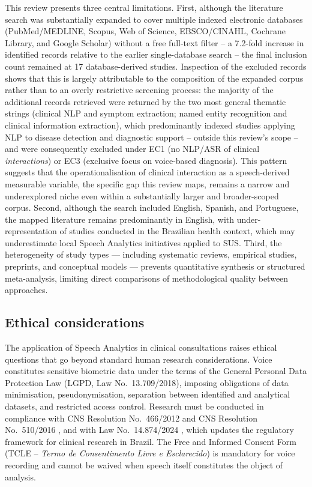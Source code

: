 \documentclass[review,12pt]{elsarticle}
\begin{document}
This review presents three central limitations.
First, although the literature search was substantially expanded to cover
multiple indexed electronic databases (PubMed/MEDLINE, Scopus, Web of
Science, EBSCO/CINAHL, Cochrane Library, and Google Scholar) without a
free full-text filter -- a 7.2-fold increase in identified records relative
to the earlier single-database search -- the final inclusion count remained
at 17 database-derived studies. Inspection of the excluded records shows
that this is largely attributable to the composition of the expanded
corpus rather than to an overly restrictive screening process: the
majority of the additional records retrieved were returned by the two most
general thematic strings (clinical NLP and symptom extraction; named
entity recognition and clinical information extraction), which
predominantly indexed studies applying NLP to disease detection and
diagnostic support -- outside this review's scope -- and were
consequently excluded under EC1 (no NLP/ASR of clinical
\emph{interactions}) or EC3 (exclusive focus on voice-based diagnosis).
This pattern suggests that the operationalisation of clinical interaction
as a speech-derived measurable variable, the specific gap this review
maps, remains a narrow and underexplored niche even within a
substantially larger and broader-scoped corpus.
Second, although the search included English, Spanish, and Portuguese, the
mapped literature remains predominantly in English, with under-representation
of studies conducted in the Brazilian health context, which may underestimate
local Speech Analytics initiatives applied to SUS.
Third, the heterogeneity of study types --- including systematic reviews,
empirical studies, preprints, and conceptual models --- prevents quantitative
synthesis or structured meta-analysis, limiting direct comparisons of
methodological quality between approaches.

\subsection*{Ethical considerations}

The application of Speech Analytics in clinical consultations raises ethical
questions that go beyond standard human research considerations.
Voice constitutes sensitive biometric data under the terms of the General
Personal Data Protection Law (LGPD, Law No.~13.709/2018), imposing
obligations of data minimisation, pseudonymisation, separation between
identified and analytical datasets, and restricted access control.
Research must be conducted in compliance with CNS Resolution
No.~466/2012 \citep{CNS466_2012} and CNS Resolution No.~510/2016
\citep{CNS510_2016}, and with Law No.~14.874/2024 \citep{Lei14874_2024},
which updates the regulatory framework for clinical research in Brazil.
The Free and Informed Consent Form (TCLE -- \textit{Termo de Consentimento
Livre e Esclarecido}) is mandatory for voice recording and cannot be waived
when speech itself constitutes the object of analysis.
\end{document}
